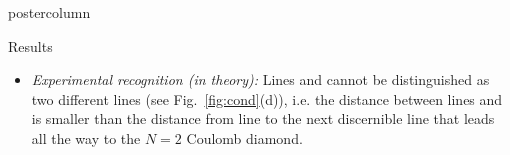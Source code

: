 \documentclass[final,hyperref={pdfpagelabels=true},notheorems]{beamer}
\begin{document}
\begin{frame}
\begin{columns}
\begin{column}{.32\textwidth}
\begin{beamercolorbox}[center,wd=\textwidth]{postercolumn}
\begin{minipage}[T]{.95\textwidth}
{\begin{block}{Results\phantom{Gg}}
\begin{itemize}
\begin{itemize}
                  \item \textsl{Experimental recognition (in theory):} Lines  and  cannot be distinguished as two different lines (see Fig.~\ref{fig:cond}(d)), i.e. the distance between lines  and  is smaller than the distance from line  to the next discernible line that leads all the way to the $N=2$ Coulomb diamond.
                \end{itemize}
              \end{itemize}
            \end{block}
          }
        \end{minipage}
      \end{beamercolorbox}
    \end{column}



\end{columns}
\end{frame}
\end{document}
